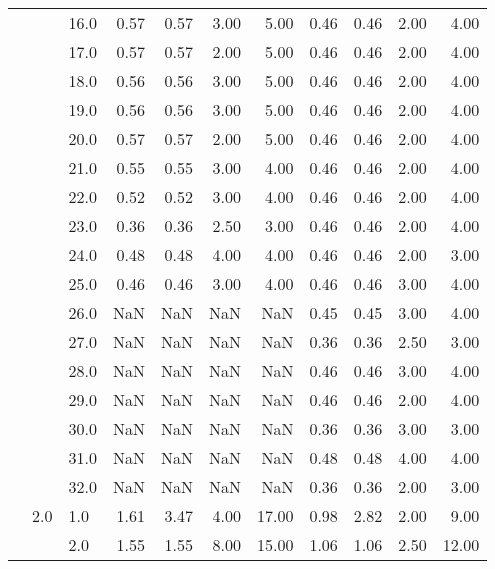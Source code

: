 \begin{tabular}{lllrrrrrrrr}
      &     & 16.0 &       0.57 &      0.57 & 3.00 &   5.00 &       0.46 &      0.46 & 2.00 &   4.00 \\
      &     & 17.0 &       0.57 &      0.57 & 2.00 &   5.00 &       0.46 &      0.46 & 2.00 &   4.00 \\
      &     & 18.0 &       0.56 &      0.56 & 3.00 &   5.00 &       0.46 &      0.46 & 2.00 &   4.00 \\
      &     & 19.0 &       0.56 &      0.56 & 3.00 &   5.00 &       0.46 &      0.46 & 2.00 &   4.00 \\
      &     & 20.0 &       0.57 &      0.57 & 2.00 &   5.00 &       0.46 &      0.46 & 2.00 &   4.00 \\
      &     & 21.0 &       0.55 &      0.55 & 3.00 &   4.00 &       0.46 &      0.46 & 2.00 &   4.00 \\
      &     & 22.0 &       0.52 &      0.52 & 3.00 &   4.00 &       0.46 &      0.46 & 2.00 &   4.00 \\
      &     & 23.0 &       0.36 &      0.36 & 2.50 &   3.00 &       0.46 &      0.46 & 2.00 &   4.00 \\
      &     & 24.0 &       0.48 &      0.48 & 4.00 &   4.00 &       0.46 &      0.46 & 2.00 &   3.00 \\
      &     & 25.0 &       0.46 &      0.46 & 3.00 &   4.00 &       0.46 &      0.46 & 3.00 &   4.00 \\
      &     & 26.0 &        NaN &       NaN &  NaN &    NaN &       0.45 &      0.45 & 3.00 &   4.00 \\
      &     & 27.0 &        NaN &       NaN &  NaN &    NaN &       0.36 &      0.36 & 2.50 &   3.00 \\
      &     & 28.0 &        NaN &       NaN &  NaN &    NaN &       0.46 &      0.46 & 3.00 &   4.00 \\
      &     & 29.0 &        NaN &       NaN &  NaN &    NaN &       0.46 &      0.46 & 2.00 &   4.00 \\
      &     & 30.0 &        NaN &       NaN &  NaN &    NaN &       0.36 &      0.36 & 3.00 &   3.00 \\
      &     & 31.0 &        NaN &       NaN &  NaN &    NaN &       0.48 &      0.48 & 4.00 &   4.00 \\
      &     & 32.0 &        NaN &       NaN &  NaN &    NaN &       0.36 &      0.36 & 2.00 &   3.00 \\
      & 2.0 & 1.0  &       1.61 &      3.47 & 4.00 &  17.00 &       0.98 &      2.82 & 2.00 &   9.00 \\
      &     & 2.0  &       1.55 &      1.55 & 8.00 &  15.00 &       1.06 &      1.06 & 2.50 &  12.00 \\

\end{tabular}
